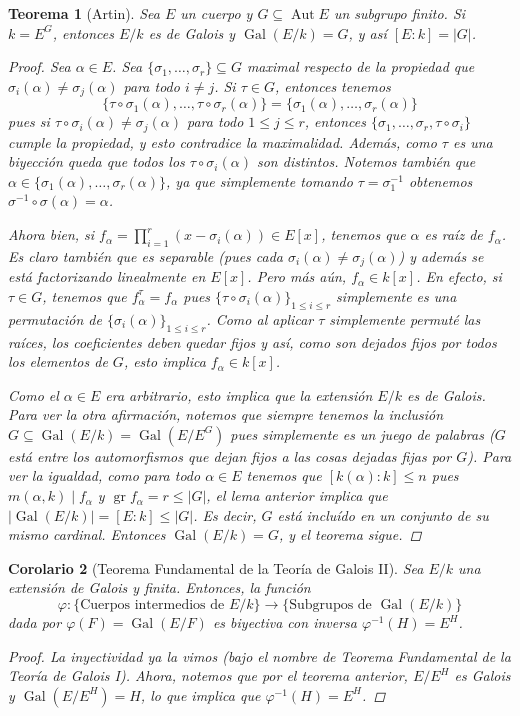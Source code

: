 \documentclass[12pt]{book}
\newtheorem{teo}{Teorema}[section]
\newtheorem{cor}[teo]{Corolario}
\theoremstyle{definition}
\DeclareMathOperator{\Aut}{Aut}
\DeclareMathOperator{\gr}{gr}
\DeclareMathOperator{\Gal}{Gal}
\begin{document}
\begin{teo}[Artin]
Sea $E$ un cuerpo y $G\subseteq\Aut E$ un subgrupo finito. Si $k=E^G$, entonces $E/k$ es de Galois y $\Gal(E/k) = G$, y así $[E:k]=|G|$.
\begin{proof}
Sea $\alpha\in E$. Sea $\{\sigma_1,\ldots , \sigma_r\}\subseteq G$ maximal respecto de la propiedad que $\sigma_i(\alpha)\neq\sigma_j(\alpha)$ para todo $i\neq j$. Si $\tau\in G$, entonces tenemos $$\{\tau\circ\sigma_1(\alpha),\ldots , \tau\circ\sigma_r(\alpha)\} = \{\sigma_1(\alpha),\ldots ,\sigma_r(\alpha)\}$$ pues si $\tau\circ\sigma_i(\alpha) \neq \sigma_j(\alpha)$ para todo $1\leq j\leq r$, entonces $\{\sigma_1,\ldots , \sigma_r, \tau\circ\sigma_i\}$ cumple la propiedad, y esto contradice la maximalidad. Además, como $\tau$ es una biyección queda que todos los $\tau\circ\sigma_i(\alpha)$ son distintos.
Notemos también que $\alpha\in \{\sigma_1(\alpha),\ldots , \sigma_r(\alpha)\}$, ya que simplemente tomando $\tau = \sigma_1^{-1}$ obtenemos $\sigma^{-1}\circ \sigma(\alpha) = \alpha$.

Ahora bien, si $f_\alpha = \displaystyle\prod_{i=1}^r (x-\sigma_i(\alpha))\in E[x]$, tenemos que $\alpha$ es raíz de $f_\alpha$. Es claro también que es separable (pues cada $\sigma_i(\alpha)\neq \sigma_j(\alpha)$) y además se está factorizando linealmente en $E[x]$. Pero más aún, $f_\alpha\in k[x]$. En efecto, si $\tau\in G$, tenemos que $f_\alpha^\tau = f_\alpha$ pues $\{\tau\circ\sigma_i(\alpha)\}_{1\leq i \leq r}$ simplemente es una permutación de $\{\sigma_i(\alpha)\}_{1\leq i \leq r}$. Como al aplicar $\tau$ simplemente permuté las raíces, los coeficientes deben quedar fijos y así, como son dejados fijos por todos los elementos de $G$, esto implica $f_\alpha\in k[x]$.

Como el $\alpha\in E$ era arbitrario, esto implica que la extensión $E/k$ es de Galois. Para ver la otra afirmación, notemos que siempre tenemos la inclusión $G\subseteq \Gal(E/k) = \Gal(E/E^G)$ pues simplemente es un juego de palabras ($G$ está entre los automorfismos que dejan fijos a las cosas dejadas fijas por $G$). Para ver la igualdad, como para todo $\alpha\in E$ tenemos que $[k(\alpha):k]\leq n$ pues $m(\alpha,k)\mid f_\alpha$ y $\gr f_\alpha = r\leq |G|$, el lema anterior implica que $|\Gal(E/k)| = [E:k]\leq |G|$. Es decir, $G$ está incluído en un conjunto de su mismo cardinal. Entonces $\Gal(E/k)=G$, y el teorema sigue.
\end{proof} 
\end{teo}

\begin{cor}[Teorema Fundamental de la Teoría de Galois II]
Sea $E/k$ una extensión de Galois y finita. Entonces, la función $$ \varphi:\{\text{Cuerpos intermedios de }E/k\}\to \{\text{Subgrupos de }\Gal(E/k)\}$$ dada por $\varphi(F)=\Gal(E/F)$ es biyectiva con inversa $\varphi^{-1}(H) = E^H$.
\begin{proof}
La inyectividad ya la vimos (bajo el nombre de Teorema Fundamental de la Teoría de Galois I). Ahora, notemos que por el teorema anterior, $E/E^H$ es Galois y $\Gal(E/E^H) = H$, lo que implica que $\varphi^{-1}(H)=E^H$.
\end{proof}
\end{cor}
\end{document}
